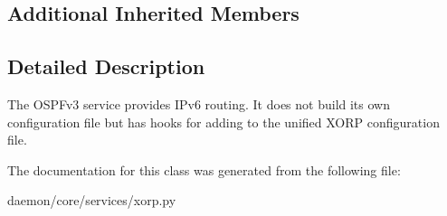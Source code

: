 \subsection*{Additional Inherited Members}


\subsection{Detailed Description}
\begin{DoxyVerb}The OSPFv3 service provides IPv6 routing. It does
    not build its own configuration file but has hooks for adding to the
    unified XORP configuration file.
\end{DoxyVerb}
 

The documentation for this class was generated from the following file\+:\begin{DoxyCompactItemize}
\item 
daemon/core/services/xorp.\+py\end{DoxyCompactItemize}
